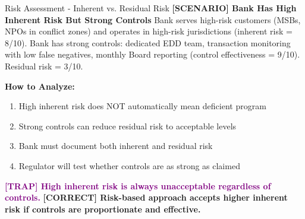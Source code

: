 \documentclass[11pt,a4paper]{beamer}
\newcommand{\trap}[1]{\textcolor{purple}{\textbf{[TRAP] #1}}}
\newcommand{\correct}[1]{\textcolor{green!50!black}{\textbf{[CORRECT] #1}}}
\newcommand{\scenario}[1]{\textcolor{blue!70!black}{\textbf{[SCENARIO] #1}}}
\begin{document}
	\begin{frame}{Risk Assessment - Inherent vs. Residual Risk}
		\scenario{Bank Has High Inherent Risk But Strong Controls}
		Bank serves high-risk customers (MSBs, NPOs in conflict zones) and operates in high-risk jurisdictions (inherent risk = 8/10). Bank has strong controls: dedicated EDD team, transaction monitoring with low false negatives, monthly Board reporting (control effectiveness = 9/10). Residual risk = 3/10.
		
		\vspace{0.1cm}
		\textbf{How to Analyze:}
		\begin{enumerate}
			\item High inherent risk does NOT automatically mean deficient program
			\item Strong controls can reduce residual risk to acceptable levels
			\item Bank must document both inherent and residual risk
			\item Regulator will test whether controls are as strong as claimed
		\end{enumerate}
		\trap{High inherent risk is always unacceptable regardless of controls.}
		\correct{Risk-based approach accepts higher inherent risk if controls are proportionate and effective.}
	\end{frame}
	
\end{document}
